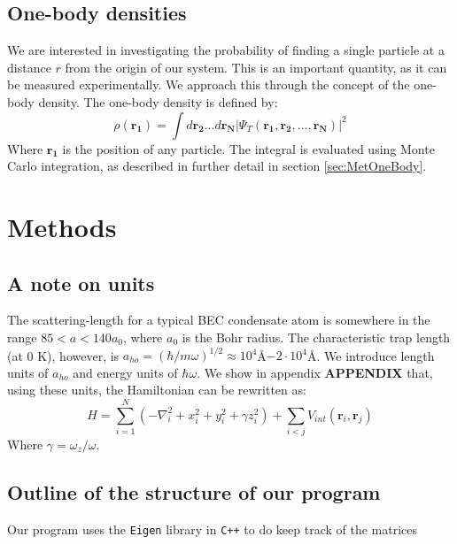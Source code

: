 \documentclass[a4paper, 10pt]{article}
\begin{document}
	\subsection{One-body densities}
	We are interested in investigating the probability of finding a single particle at a distance $r$ from the origin of our system. This is an important quantity, as it can be measured experimentally. We approach this through the concept of the one-body density. The one-body density is defined by:
	\begin{equation}\label{eq:OneBodyDensity}
	\rho(\boldsymbol{r_1})=\int d\boldsymbol{r_2}...d\boldsymbol{r_N}|\Psi_T(\boldsymbol{r_1},\boldsymbol{r_2},...,\boldsymbol{r_N})|^2
	\end{equation}
	Where $\boldsymbol{r_1}$ is the position of any particle. The integral is evaluated using Monte Carlo integration, as described in further detail in section \ref{sec:MetOneBody}.
	
	
	
	
	\section{Methods}\label{Method_section}
	\subsection{A note on units}
	The scattering-length for a typical BEC condensate atom is somewhere in the range $85<a<140a_0$, where $a_0$ is the Bohr radius. The characteristic trap length (at 0 K), however, is $a_{ho}=(\hbar/m\omega)^{1/2}\approx 10^{4}$Å$-2\cdot 10^{4}$Å. We introduce length units of $a_{ho}$ and energy units of $\hbar \omega$. We show in appendix \textbf{APPENDIX} that, using these units, the Hamiltonian can be rewritten as:
	\begin{equation}\label{eq:Hamiltonian_dimensionless}
	H=\sum_{i=1}^N\left(-\nabla_i^2 + x_i^2+y_i^2+\gamma z_i^2\right)+\sum_{i<j}V_{int}(\boldsymbol{r}_i, \boldsymbol{r}_j)
	\end{equation}
	Where $\gamma=\omega_z/\omega$.
	
	
	
	\subsection{Outline of the structure of our program}
	Our program uses the \texttt{Eigen} library in \texttt{C++} to do keep track of the matrices  
\end{document}
